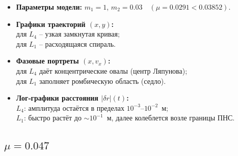 \documentclass[12pt]{article}
\begin{document}
\begin{itemize}
  \item \textbf{Параметры модели:} $m_1=1$, $m_2=0.03\quad(\mu=0.0291<0.03852)$.
  \item \textbf{Графики траекторий $(x,y)$:}\\
        для $L_4$ -- узкая замкнутая кривая;\\
        для $L_1$ -- расходящаяся спираль. 
  \item \textbf{Фазовые портреты $(x,v_x)$:}\\
        для $L_4$ даёт концентрические овалы (центр Ляпунова);\\
        для $L_1$ заполняет ромбическую область (седло).
  \item \textbf{Лог‑графики расстояния $|\delta r|(t)$:}\\
        $L_4$: амплитуда остаётся в пределах $10^{-3}$--$10^{-2}$~м;\\
        $L_1$: быстро растёт до $\sim10^{-1}$~м, далее колеблется возле границы ПНС.
\end{itemize}

\subsection{$\mu=0.047$} 
\end{document}
